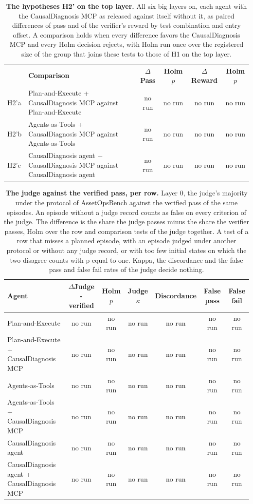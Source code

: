 \documentclass[10pt]{article}
\begin{document}
\begin{table}[H]\centering\footnotesize
\caption{\textbf{The hypotheses H2' on the top layer.} All six big layers on, each agent with the CausalDiagnosis MCP as released against itself without it, as paired differences of pass and of the verifier's reward by test combination and entry offset. A comparison holds when every difference favors the CausalDiagnosis MCP and every Holm decision rejects, with Holm run once over the registered size of the group that joins these tests to those of H1 on the top layer.}
\label{tab:mcptop}
\setlength{\tabcolsep}{3pt}
\begin{tabular}{l>{\raggedright\arraybackslash}p{8.8cm}cccc}
\toprule
 & Comparison & $\Delta$Pass & Holm $p$ & $\Delta$Reward & Holm $p$ \\
\midrule
H2'a & Plan-and-Execute + CausalDiagnosis MCP against Plan-and-Execute & no run & no run & no run & no run \\
H2'b & Agents-as-Tools + CausalDiagnosis MCP against Agents-as-Tools & no run & no run & no run & no run \\
H2'c & CausalDiagnosis agent + CausalDiagnosis MCP against CausalDiagnosis agent & no run & no run & no run & no run \\
\bottomrule
\end{tabular}
\end{table}
\vspace{-8pt}
\begin{table}[H]\centering\footnotesize
\caption{\textbf{The judge against the verified pass, per row.} Layer 0, the judge's majority under the protocol of AssetOpsBench against the verified pass of the same episodes. An episode without a judge record counts as false on every criterion of the judge. The difference is the share the judge passes minus the share the verifier passes, Holm over the row and comparison tests of the judge together. A test of a row that misses a planned episode, with an episode judged under another protocol or without any judge record, or with too few initial states on which the two disagree counts with p equal to one. Kappa, the discordance and the false pass and false fail rates of the judge decide nothing.}
\label{tab:judgerows}
\setlength{\tabcolsep}{3pt}
\begin{tabular}{lcccccc}
\toprule
Agent & $\Delta$Judge - verified & Holm $p$ & Judge $\kappa$ & Discordance & False pass & False fail \\
\midrule
Plan-and-Execute & no run & no run & no run & no run & no run & no run \\
Plan-and-Execute + CausalDiagnosis MCP & no run & no run & no run & no run & no run & no run \\
Agents-as-Tools & no run & no run & no run & no run & no run & no run \\
Agents-as-Tools + CausalDiagnosis MCP & no run & no run & no run & no run & no run & no run \\
CausalDiagnosis agent & no run & no run & no run & no run & no run & no run \\
CausalDiagnosis agent + CausalDiagnosis MCP & no run & no run & no run & no run & no run & no run \\
\bottomrule
\end{tabular}
\end{table}
\end{document}
